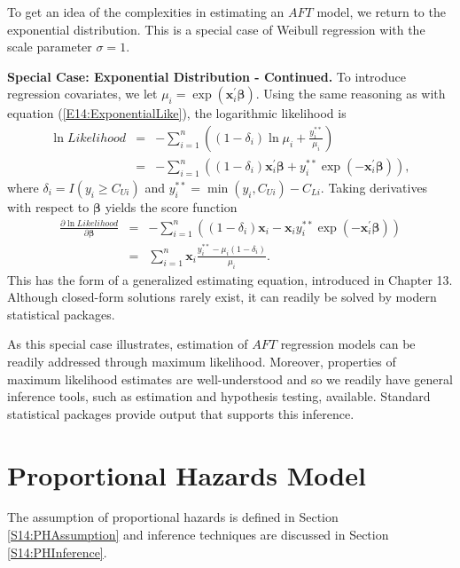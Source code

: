 To get an idea of the complexities in estimating an $AFT$ model, we
return to the exponential distribution. This is a special case of
Weibull regression with the scale parameter $\sigma =1$.


\linejed

\textbf{Special Case: Exponential Distribution - Continued.} To
introduce regression covariates, we let $\mu_i = \exp
(\mathbf{x}_i^{\prime} \boldsymbol \beta)$. Using the same reasoning
as with equation (\ref{E14:ExponentialLike}), the logarithmic
likelihood is
\begin{eqnarray*}
 \ln Likelihood
 &=&  - \sum_{i=1}^n ((1-\delta_i) \ln \mu_i +\frac{y_i^{\ast
 \ast}}{\mu_i} )\\
 &=&  - \sum_{i=1}^n ((1-\delta_i) \mathbf{x}_i^{\prime} \boldsymbol \beta+ y_i^{\ast
 \ast}\exp
(-\mathbf{x}_i^{\prime} \boldsymbol \beta)) ,
\end{eqnarray*}
where $\delta_i = I(y_i \geq C_{Ui})$ and $y_i^{\ast \ast} =
\min(y_i, C_{Ui}) - C_{Li}$. Taking derivatives with respect to
$\boldsymbol \beta$ yields the score function
\begin{eqnarray*}
\frac{\partial \ln Likelihood}{\partial \boldsymbol \beta}
 &=&  - \sum_{i=1}^n ((1-\delta_i) \mathbf{x}_i - \mathbf{x}_i y_i^{\ast
 \ast}\exp
(-\mathbf{x}_i^{\prime} \boldsymbol \beta)) \\
 &=&    \sum_{i=1}^n  \mathbf{x}_i
\frac{y_i^{\ast
 \ast}-\mu_i (1-\delta_i)}
{\mu_i } .
\end{eqnarray*}
This has the form of a generalized estimating equation, introduced
in Chapter 13. Although closed-form solutions rarely exist, it can
readily be solved by modern statistical packages.

\linejed

As this special case illustrates, estimation of $AFT$ regression
models can be readily addressed through maximum likelihood.
Moreover, properties of maximum likelihood estimates are
well-understood and so we readily have general inference tools, such
as estimation and hypothesis testing, available. Standard
statistical packages provide output that supports this inference.


\section{Proportional Hazards Model}\label{S14:Cox}

The assumption of proportional hazards is defined in Section
\ref{S14:PHAssumption} and inference techniques are discussed in
Section \ref{S14:PHInference}.

